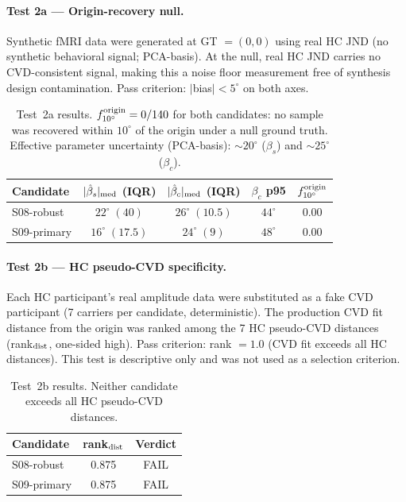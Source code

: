 \paragraph{Test 2a — Origin-recovery null.}

Synthetic fMRI data were generated at GT $= (0, 0)$ using real HC
JND (no synthetic behavioral signal; PCA-basis).
At the null, real HC JND carries no CVD-consistent signal, making
this a noise floor measurement free of synthesis design
contamination.
Pass criterion: $|$bias$| < 5^\circ$ on both axes.

\begin{table}[h]
\centering
\begin{tabular}{lcccc}
\hline
Candidate
  & $|\hat\beta_s|_{\rm med}$ (IQR)
  & $|\hat\beta_c|_{\rm med}$ (IQR)
  & $\beta_c$ p95
  & $f_{10^\circ}^{\rm origin}$ \\
\hline
S08-robust  & $22^\circ\;(40)$ & $26^\circ\;(10.5)$ & $44^\circ$ & 0.00 \\
S09-primary & $16^\circ\;(17.5)$ & $24^\circ\;(9)$  & $48^\circ$ & 0.00 \\
\hline
\end{tabular}
\caption{Test~2a results. $f_{10^\circ}^{\rm origin} = 0/140$ for
both candidates: no sample was recovered within $10^\circ$ of the
origin under a null ground truth.
Effective parameter uncertainty (PCA-basis): $\sim\!20^\circ$ ($\beta_s$)
and $\sim\!25^\circ$ ($\beta_c$).}
\end{table}

\paragraph{Test 2b — HC pseudo-CVD specificity.}

Each HC participant's real amplitude data were substituted as a
fake CVD participant (7 carriers per candidate, deterministic).
The production CVD fit distance from the origin was ranked among
the 7 HC pseudo-CVD distances (rank$_{\rm dist}$, one-sided high).
Pass criterion: rank $= 1.0$ (CVD fit exceeds all HC distances).
This test is descriptive only and was not used as a selection
criterion.

\begin{table}[h]
\centering
\begin{tabular}{lcc}
\hline
Candidate & rank$_{\rm dist}$ & Verdict \\
\hline
S08-robust  & 0.875 & FAIL \\
S09-primary & 0.875 & FAIL \\
\hline
\end{tabular}
\caption{Test~2b results. Neither candidate exceeds all HC
pseudo-CVD distances.}
\end{table}

